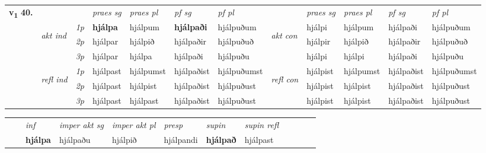\begin{tabular}{llllllllllll} \toprule
\multirow{4}{*}{{{\textbf{v{\textsubscript{1}}} \Large{\textbf{40.}}}}}  & &   &  \textit{praes sg}  & \textit{praes pl}  &\textit{ pf sg} & \textit{pf pl} &  &  \textit{praes sg}  & \textit{praes pl}  & \textit{pf sg} & \textit{pf pl } \\*
	\cmidrule{4-7} \cmidrule{9-12}
 & \multirow{3}{*}{\begin{turn}{90}\textit{akt ind}\end{turn}} & {\textit{1p}} & \textbf{hjálpa} & hjálpum    & \textbf{hjálpaði} & hjálpuðum & \multirow{3}{*}{\begin{turn}{90}\textit{akt con}\end{turn}} &hjálpi & hjálpum & hjálpaði & hjálpuðum\\*
& &  {\textit{2p}} &  hjálpar  & hjálpið   & hjálpaðir & hjálpuðuð & & hjálpir & hjálpið & hjálpaðir & hjálpuðuð \\*
& &  {\textit{3p}} & hjálpar & hjálpa   & hjálpaði & hjálpuðu & & hjálpi & hjálpi& hjálpaði & hjálpuðu  \\*
\cmidrule{4-7} \cmidrule{9-12}
 &\multirow{3}{*}{\begin{turn}{90}\textit{refl ind}\end{turn}} & {\textit{1p}} & hjálpast & hjálpumst    & hjálpaðist & hjálpuðumst & \multirow{3}{*}{\begin{turn}{90}\textit{refl con}\end{turn}}  &hjálpist & hjálpumst & hjálpaðist & hjálpuðumst\\*
 &&  {\textit{2p}} &  hjálpast  & hjálpist   & hjálpaðist & hjálpuðust & &hjálpist & hjálpist & hjálpaðist & hjálpuðust \\*
& &  {\textit{3p}} & hjálpast & hjálpast   & hjálpaðist & hjálpuðust & & hjálpist & hjálpist& hjálpaðist & hjálpuðust  \\*
\cmidrule{4-7} \cmidrule{9-12}
\end{tabular}


\begin{tabular}{llllllllllll}
 & & \textit{inf} & \textit{imper akt sg} & \textit{imper akt pl}   & \textit{presp} & \textit{supin} & \textit{supin refl}      \\*
  & & \textbf{hjálpa} & hjálpaðu  & hjálpið   & hjálpandi &  \textbf{hjálpað} & hjálpast  \\*
\cmidrule{1-12}
\end{tabular}



